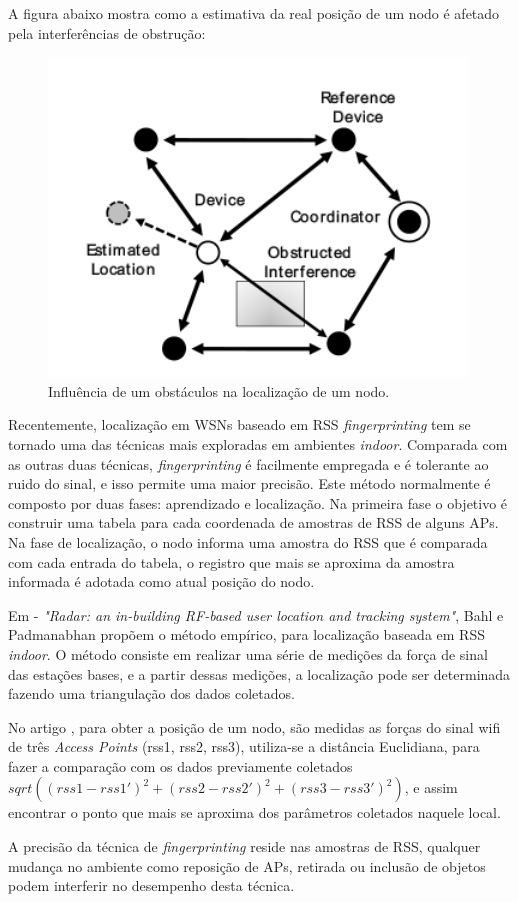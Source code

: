 A figura abaixo mostra como a estimativa da real posição de um nodo é afetado pela interferências de obstrução:
	\begin{figure}[ht]
	\centering
	\includegraphics[scale=0.5]{images/rsserror.png}
	\caption{Influência de um obstáculos na localização de um nodo\cite{rss1}. }
	\label{fig:rsserror}
	\end{figure}
	
	Recentemente, localização em WSNs baseado em RSS \textit{fingerprinting} tem se tornado uma das técnicas mais exploradas 
	em ambientes \textit{indoor}\cite{fingerPrint}\cite{wifiRadar}\cite{fingerPrint2}. Comparada com as outras duas técnicas, \textit{fingerprinting} é facilmente empregada 
	e é tolerante ao ruido do sinal, e isso permite uma maior precisão. Este método normalmente é composto por duas fases: 
	aprendizado e localização. Na primeira fase o objetivo é construir uma tabela para cada coordenada de amostras de RSS 
	de alguns APs. Na fase de localização, o nodo informa uma amostra do RSS que é comparada com cada entrada do tabela, o registro
	que mais se aproxima da amostra informada é adotada como atual posição do nodo.
	
   Em \cite{wifiRadar} - \textit{"Radar: an in-building RF-based user location and tracking system"}, Bahl e Padmanabhan propõem o método empírico,
   para localização baseada em RSS \textit{indoor}. O método consiste em realizar uma série de medições da força de sinal das estações bases, 
   e a partir dessas medições, a localização pode ser determinada fazendo uma triangulação dos dados coletados. 

  No artigo \cite{wifiRadar}, para obter a posição de um nodo, são medidas as forças do sinal wifi de três \textit{Access Points} (rss1, rss2, rss3), 
utiliza-se a distância Euclidiana, para fazer a comparação com os dados previamente coletados $sqrt((rss1-rss1')^{2}+(rss2-rss2')^{2}+(rss3-rss3')^{2})$, 
e assim encontrar o ponto que mais se aproxima dos parâmetros coletados naquele local. 
	
	A precisão da técnica de \textit{fingerprinting} reside nas amostras de RSS, qualquer mudança no ambiente como 
	reposição de APs, retirada ou inclusão de objetos podem interferir no desempenho desta técnica.


